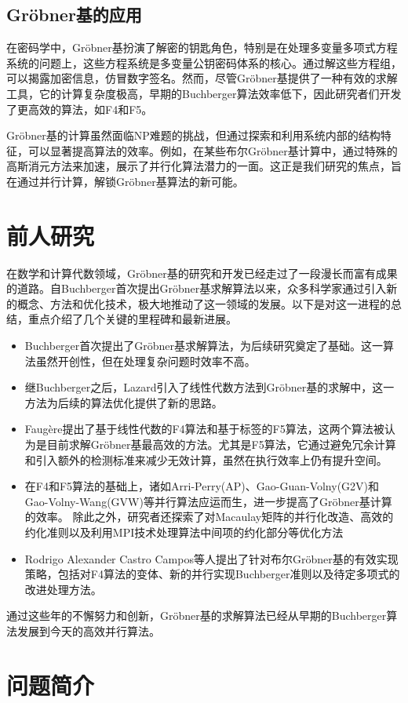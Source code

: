 \documentclass[UTF8,a4paper,10pt]{ctexart}
\begin{document}
\subsection{Gröbner基的应用}
在密码学中，Gröbner基扮演了解密的钥匙角色，特别是在处理多变量多项式方程系统的问题上，这些方程系统是多变量公钥密码体系的核心。通过解这些方程组，可以揭露加密信息，仿冒数字签名。然而，尽管Gröbner基提供了一种有效的求解工具，它的计算复杂度极高，早期的Buchberger算法效率低下，因此研究者们开发了更高效的算法，如F4和F5。

Gröbner基的计算虽然面临NP难题的挑战，但通过探索和利用系统内部的结构特征，可以显著提高算法的效率。例如，在某些布尔Gröbner基计算中，通过特殊的高斯消元方法来加速，展示了并行化算法潜力的一面。这正是我们研究的焦点，旨在通过并行计算，解锁Gröbner基算法的新可能。
\section{前人研究}
在数学和计算代数领域，Gröbner基的研究和开发已经走过了一段漫长而富有成果的道路。自Buchberger首次提出Gröbner基求解算法以来，众多科学家通过引入新的概念、方法和优化技术，极大地推动了这一领域的发展。以下是对这一进程的总结，重点介绍了几个关键的里程碑和最新进展。
\begin{itemize}
  \item Buchberger首次提出了Gröbner基求解算法，为后续研究奠定了基础。这一算法虽然开创性，但在处理复杂问题时效率不高。
  \item 继Buchberger之后，Lazard引入了线性代数方法到Gröbner基的求解中，这一方法为后续的算法优化提供了新的思路。
  \item Faugère提出了基于线性代数的F4算法和基于标签的F5算法，这两个算法被认为是目前求解Gröbner基最高效的方法。尤其是F5算法，它通过避免冗余计算和引入额外的检测标准来减少无效计算，虽然在执行效率上仍有提升空间。
  \item 在F4和F5算法的基础上，诸如Arri-Perry(AP)\cite{2}、Gao-Guan-Volny(G2V)\cite{4}和Gao-Volny-Wang(GVW)\cite{5}等并行算法应运而生，进一步提高了Gröbner基计算的效率。
除此之外，研究者还探索了对Macaulay矩阵的并行化改造、高效的约化准则以及利用MPI技术处理算法中间项的约化部分等优化方法\cite{7}
  \item Rodrigo Alexander Castro Campos等人提出了针对布尔Gröbner基的有效实现策略，包括对F4算法的变体、新的并行实现Buchberger准则以及待定多项式的改进处理方法。\cite{3}
\end{itemize}

通过这些年的不懈努力和创新，Gröbner基的求解算法已经从早期的Buchberger算法发展到今天的高效并行算法。
\section{问题简介}
\end{document}
